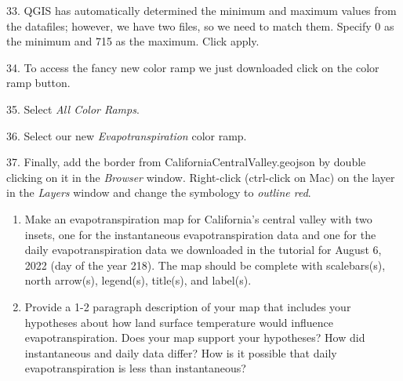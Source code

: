 \documentclass[oneside,a4paper,11pt,explicit]{book}
\begin{document}
33. QGIS has automatically determined the minimum and maximum values from the datafiles; however, we have two files, so we need to match them. Specify 0 as the minimum and 715 as the maximum. Click apply.

34. To access the fancy new color ramp we just downloaded click on the color ramp button.

35. Select \textit{All Color Ramps}.

36. Select our new \textit{Evapotranspiration} color ramp. 

37. Finally, add the border from CaliforniaCentralValley.geojson by double clicking on it in the \textit{Browser} window. Right-click (ctrl-click on Mac) on the layer in the \textit{Layers} window and change the symbology to \textit{outline red}. 


\begin{tcolorbox}[colback=yellow!5!white,colframe=IceCreamOrbit,title= \vspace{.2em} \Large Map of the Week Assignments]
	\large
	\begin{enumerate}
		\item Make an evapotranspiration map for California's central valley with two insets, one for the instantaneous evapotranspiration data and one for the daily evapotranspiration data we downloaded in the tutorial for August 6, 2022 (day of the year 218). The map should be complete with scalebars(s), north arrow(s), legend(s), title(s), and label(s). 
        \item Provide a 1-2 paragraph description of your map that includes your hypotheses about how land surface temperature would influence evapotranspiration. Does your map support your hypotheses? How did instantaneous and daily data differ? How is it possible that daily evapotranspiration is less than instantaneous?
	\end{enumerate}
\end{tcolorbox}
\end{document}

